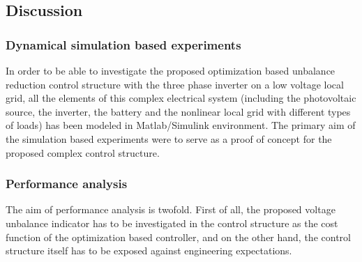 %

\subsection{Discussion}
    \subsubsection{Dynamical simulation based experiments}
    In order to be able to investigate the proposed optimization based unbalance reduction control structure with the three phase inverter on a low voltage local grid, all the elements of this complex electrical system (including the photovoltaic source, the inverter, the battery and the nonlinear local grid with different types of loads) has been modeled in Matlab/Simulink environment. The primary aim of the simulation based experiments were to serve as a proof of concept for the proposed complex control structure.
    \subsubsection{Performance analysis}
    The aim of performance analysis is twofold. First of all, the proposed voltage unbalance indicator has to be investigated in the control structure as the cost function of the optimization based controller, and on the other hand, the control structure itself has to be exposed against engineering expectations.


